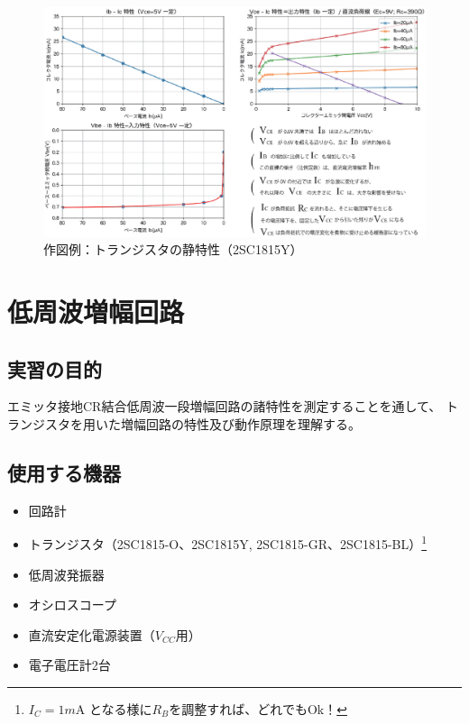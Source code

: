 \documentclass[uplatex,a4paper,11pt,oneside,openany]{jsbook}
\begin{document}
\begin{figure}[H]
  \centering
   \includegraphics[keepaspectratio, scale=0.7, angle=90]
               {figs/eps/statictate.eps}
               \caption{作図例：トランジスタの静特性（2SC1815Y）}
               \label{fig:staticexample}
\end{figure}

\newpage

\chapter{低周波増幅回路}

\section{実習の目的}

エミッタ接地CR結合低周波一段増幅回路の諸特性を測定することを通して、
トランジスタを用いた増幅回路の特性及び動作原理を理解する。

\section{使用する機器}

\begin{itemize}
\item 回路計
\item トランジスタ（2SC1815-O、2SC1815Y, 2SC1815-GR、2SC1815-BL）\footnote{$I_C=1m$A となる様に$R_B$を調整すれば、どれでもOk！}
\item 低周波発振器
\item オシロスコープ
\item 直流安定化電源装置（$V_{CC}$用）
\item 電子電圧計2台
\end{itemize}
\end{document}
